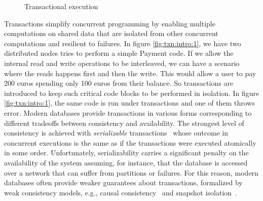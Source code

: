 \begin{figure}
\begin{minipage}{.45\textwidth}
{  
        }
        \caption{Transactional execution}
        \label{fig:txn:intro:2}
    \end{minipage}
\end{figure}

Transactions simplify concurrent programming by enabling multiple computations on shared data that are isolated from other concurrent computations and resilient to failures.
In figure \ref{fig:txn:intro:1}, we have two distributed nodes tries to perform a simple \textsf{Payment} code. If we allow the internal read and write operations to be interleaved, we can have a scenario where the reads happens first and then the write. This would allow a user to pay 200 euros spending only 100 euros from their balance. So transactions are introduced to keep such critical code blocks to be performed in isolation. In figure \ref{fig:txn:intro:1}, the same code is run under transactions and one of them throws error. Modern databases provide transactions in various forms corresponding to different tradeoffs between consistency and availability. The strongest level of consistency is achieved with \emph{serializable} transactions~\cite{DBLP:journals/jacm/Papadimitriou79b} whose outcome in concurrent executions is the same as if the transactions were executed atomically in some order. Unfortunately, serializability carries a significant penalty on the availability of the system assuming, for instance, that the database is accessed over a network that can suffer from partitions or failures. For this reason, modern databases often provide weaker guarantees about transactions, formalized by weak consistency models, e.g., causal consistency~\cite{DBLP:journals/cacm/Lamport78} and snapshot isolation~\cite{DBLP:conf/sigmod/BerensonBGMOO95}.

